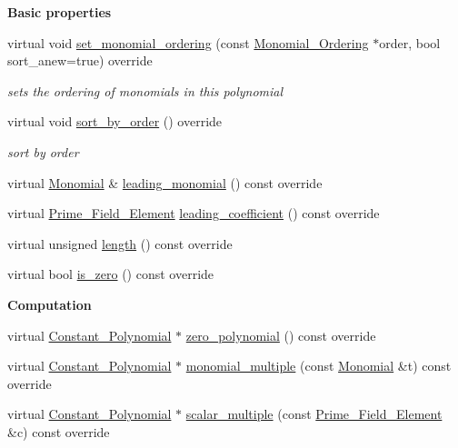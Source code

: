 \begin{Indent}\textbf{ Basic properties}\par
\begin{DoxyCompactItemize}
\item 
virtual void \hyperlink{group__polygroup_a539835f92490fbbb5ba3b37e4f80ef49}{set\+\_\+monomial\+\_\+ordering} (const \hyperlink{group__orderinggroup_class_monomial___ordering}{Monomial\+\_\+\+Ordering} $\ast$order, bool sort\+\_\+anew=true) override
\begin{DoxyCompactList}\small\item\em sets the ordering of monomials in this polynomial \end{DoxyCompactList}\item 
virtual void \hyperlink{group__polygroup_a808018b52eca472a7a1b2995e403f35a}{sort\+\_\+by\+\_\+order} () override
\begin{DoxyCompactList}\small\item\em sort by order \end{DoxyCompactList}\item 
virtual \hyperlink{group__polygroup_class_monomial}{Monomial} \& \hyperlink{group__polygroup_a08a102d5d0f33bc9cc604316e6256788}{leading\+\_\+monomial} () const override
\item 
virtual \hyperlink{group___fields_group_class_prime___field___element}{Prime\+\_\+\+Field\+\_\+\+Element} \hyperlink{group__polygroup_ab1451de8d6d9f9b0c7df2aef7b32625d}{leading\+\_\+coefficient} () const override
\item 
virtual unsigned \hyperlink{group__polygroup_a9a6bcfaf1f4d6260b39f6abfb2b646ea}{length} () const override
\item 
virtual bool \hyperlink{group__polygroup_a14a9a2dbab454f5b20441a51a6000888}{is\+\_\+zero} () const override
\end{DoxyCompactItemize}
\end{Indent}
\begin{Indent}\textbf{ Computation}\par
\begin{DoxyCompactItemize}
\item 
virtual \hyperlink{group__polygroup_class_constant___polynomial}{Constant\+\_\+\+Polynomial} $\ast$ \hyperlink{group__polygroup_af7933d269e23525f1f357c0e00bc71ea}{zero\+\_\+polynomial} () const override
\item 
virtual \hyperlink{group__polygroup_class_constant___polynomial}{Constant\+\_\+\+Polynomial} $\ast$ \hyperlink{group__polygroup_ae0af1a1cf7c7eed390b25a951a685da2}{monomial\+\_\+multiple} (const \hyperlink{group__polygroup_class_monomial}{Monomial} \&t) const override
\item 
virtual \hyperlink{group__polygroup_class_constant___polynomial}{Constant\+\_\+\+Polynomial} $\ast$ \hyperlink{group__polygroup_afd8bdd523c36fbde64df0bf36a0f4e77}{scalar\+\_\+multiple} (const \hyperlink{group___fields_group_class_prime___field___element}{Prime\+\_\+\+Field\+\_\+\+Element} \&c) const override
\end{DoxyCompactItemize}
\end{Indent}

